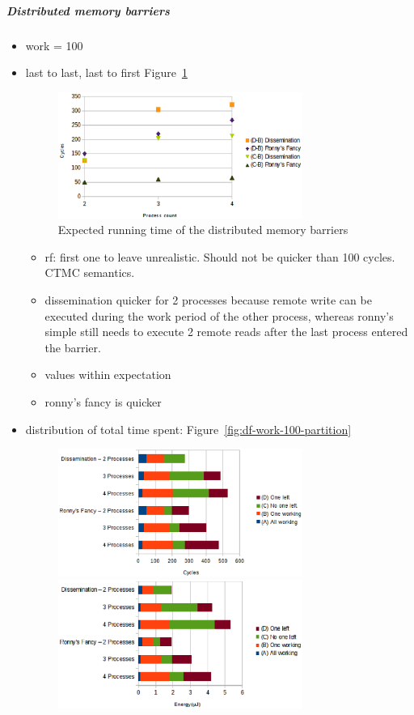 \documentclass[a4paper, 10pt]{article}
\begin{document}
\subparagraph{Distributed memory barriers}
\label{sssssec:analysis-modelchecking-quantitative-properties-results-distributed}
\begin{itemize}
	\item work = 100
	\item last to last, last to first Figure~\ref{fig:df-time-work-100-B-C-D}
		\begin{figure}[htbp]
			\centering
			\includegraphics[width=8cm]{charts/df-time-work-100-B-C-D}
			\caption{Expected running time of the distributed memory barriers}
			\label{fig:df-time-work-100-B-C-D}
		\end{figure}
		\begin{itemize}
			\item rf: first one to leave unrealistic. Should not be quicker than 100 cycles. CTMC semantics.
			\item dissemination quicker for 2 processes because remote write can be executed during the work period of the other process, whereas ronny's simple still needs to execute 2 remote reads after the last process entered the barrier.
			\item values within expectation
			\item ronny's fancy is quicker
		\end{itemize}
	\item distribution of total time spent: Figure~\ref{fig:df-work-100-partition}
		\begin{figure}[htbp]
			\centering
			\includegraphics[width=8cm]{charts/df-time-work-100-partition}
			\includegraphics[width=8cm]{charts/df-energy-work-100-partition}

\end{figure}
\end{itemize}
\end{document}
